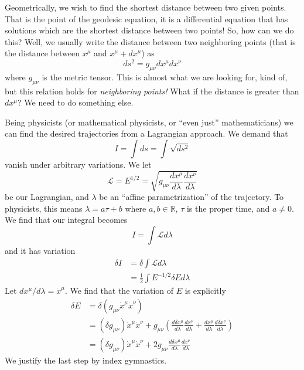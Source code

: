 
Geometrically, we wish to find the shortest distance between two
given points. That is the point of the geodesic equation, it is a
differential equation that has solutions which are the shortest
distance between two points! So, how can we do this? Well, we
usually write the distance between two neighboring points (that
is the distance between $x^\mu$ and $x^\mu + dx^\mu$) as
\begin{equation}
ds^2 = g_{\mu\nu}dx^{\mu}dx^{\nu}
\end{equation}
where $g_{\mu\nu}$ is the metric tensor. This is almost what we
are looking for, kind of, but this relation holds for
\emph{neighboring points!} What if the distance is greater than
$dx^{\mu}$? We need to do something else.

Being physicists (or mathematical physicists, or ``even just''
mathematicians) we can find the desired trajectories from a
Lagrangian approach. We demand that
\begin{equation}
I = \int ds = \int \sqrt{ds^2}
\end{equation}
vanish under arbitrary variations. We let
\begin{equation}
\mathcal{L} = E^{1/2} =
\sqrt{g_{\mu\nu}\frac{dx^{\mu}}{d\lambda}\frac{dx^{\nu}}{d\lambda}}
\end{equation}
be our Lagrangian, and $\lambda$ be an ``affine parametrization''
of the trajectory. To physicists, this means $\lambda=a\tau+b$
where $a,b\in\mathbb{R}$, $\tau$ is the proper time, and
$a\neq0$. We find that our integral becomes
\begin{equation}
I = \int\mathcal{L}d\lambda
\end{equation}
and it has variation
\begin{subequations}
\begin{align}
\delta I &= \delta\int\mathcal{L}d\lambda\\
&=\frac{1}{2}\int E^{-1/2}\delta Ed\lambda
\end{align}
\end{subequations}
Let $dx^{\mu}/d\lambda=\dot{x}^{\mu}$. We find that the variation
of $E$ is explicitly 
\begin{subequations}
\begin{align}
\delta E &=
\delta\left(g_{\mu\nu}\dot{x}^{\mu}\dot{x}^{\nu}\right)\\
&= (\delta g_{\mu\nu})\dot{x}^{\mu}\dot{x}^{\nu} +
g_{\mu\nu}\left(\frac{d\delta x^{\mu}}{d\lambda}\frac{dx^{\nu}}{d\lambda}+\frac{dx^{\mu}}{d\lambda}\frac{d\delta x^{\nu}}{d\lambda}\right)\\
&= (\delta g_{\mu\nu})\dot{x}^{\mu}\dot{x}^{\nu} +
2g_{\mu\nu}\frac{d\delta
  x^{\mu}}{d\lambda}\frac{dx^{\nu}}{d\lambda}
\end{align}
\end{subequations}
We justify the last step by index gymnastics. 

